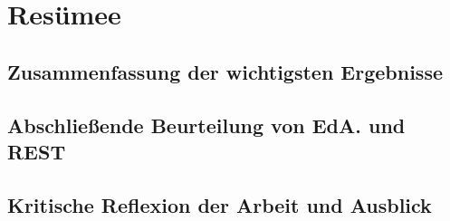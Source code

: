 \section{Resümee}
\subsection{Zusammenfassung der wichtigsten Ergebnisse}
\subsection{Abschließende Beurteilung von EdA. und REST}
\subsection{Kritische Reflexion der Arbeit und Ausblick}
